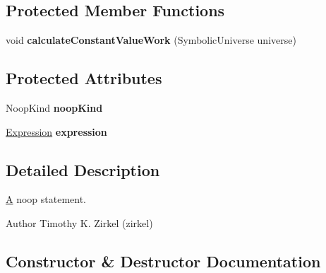 \subsection*{Protected Member Functions}
\begin{DoxyCompactItemize}
\item 
\hypertarget{classedu_1_1udel_1_1cis_1_1vsl_1_1civl_1_1model_1_1common_1_1statement_1_1CommonNoopStatement_a061a8b5a78bb8f9edf69f71c8e373c6a}{}void {\bfseries calculate\+Constant\+Value\+Work} (Symbolic\+Universe universe)\label{classedu_1_1udel_1_1cis_1_1vsl_1_1civl_1_1model_1_1common_1_1statement_1_1CommonNoopStatement_a061a8b5a78bb8f9edf69f71c8e373c6a}

\end{DoxyCompactItemize}
\subsection*{Protected Attributes}
\begin{DoxyCompactItemize}
\item 
\hypertarget{classedu_1_1udel_1_1cis_1_1vsl_1_1civl_1_1model_1_1common_1_1statement_1_1CommonNoopStatement_a34c5c7ac00a7258364968962eed974bf}{}Noop\+Kind {\bfseries noop\+Kind}\label{classedu_1_1udel_1_1cis_1_1vsl_1_1civl_1_1model_1_1common_1_1statement_1_1CommonNoopStatement_a34c5c7ac00a7258364968962eed974bf}

\item 
\hypertarget{classedu_1_1udel_1_1cis_1_1vsl_1_1civl_1_1model_1_1common_1_1statement_1_1CommonNoopStatement_a765a23415c79be92402f3da3b839d461}{}\hyperlink{interfaceedu_1_1udel_1_1cis_1_1vsl_1_1civl_1_1model_1_1IF_1_1expression_1_1Expression}{Expression} {\bfseries expression}\label{classedu_1_1udel_1_1cis_1_1vsl_1_1civl_1_1model_1_1common_1_1statement_1_1CommonNoopStatement_a765a23415c79be92402f3da3b839d461}

\end{DoxyCompactItemize}


\subsection{Detailed Description}
\hyperlink{structA}{A} noop statement. 

\begin{DoxyAuthor}{Author}
Timothy K. Zirkel (zirkel) 
\end{DoxyAuthor}


\subsection{Constructor \& Destructor Documentation}
\hypertarget{classedu_1_1udel_1_1cis_1_1vsl_1_1civl_1_1model_1_1common_1_1statement_1_1CommonNoopStatement_ac6b237f9e79e7e735887ef154286724a}{}
